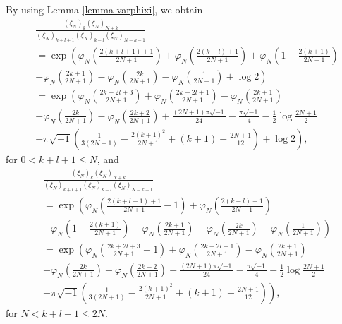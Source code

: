 \documentclass[12pt]{amsart}
\begin{document}
By using Lemma \ref{lemma-varphixi},  we obtain 
\begin{align}
    &\frac{(\xi_N)_k(\xi_N)_{N+k}}{(\xi_N)_{k+l+1}(\xi_N)_{k-l}(\xi_N)_{N-k-1}}\\\nonumber
    &=\exp\left(\varphi_N\left(\frac{2(k+l+1)+1}{2N+1}\right)+\varphi_N\left(\frac{2(k-l)+1}{2N+1}\right)+\varphi_N\left(1-\frac{2(k+1)}{2N+1}\right)\right.\\\nonumber
    &\left.-\varphi_N\left(\frac{2k+1}{2N+1}\right)-\varphi_N\left(\frac{2k}{2N+1}\right)-\varphi_N\left(\frac{1}{2N+1}\right)+\log 2\right) \\\nonumber
    &=\exp\left(\varphi_N\left(\frac{2k+2l+3}{2N+1}\right)+\varphi_N\left(\frac{2k-2l+1}{2N+1}\right)-\varphi_N\left(\frac{2k+1}{2N+1}\right)\right.\\\nonumber
    &\left.-\varphi_N\left(\frac{2k}{2N+1}\right)-\varphi_N\left(\frac{2k+2}{2N+1}\right)+\frac{(2N+1)\pi\sqrt{-1}}{24 }-\frac{\pi \sqrt{-1}}{4}-\frac{1}{2}\log \frac{2N+1}{2}\right.\\\nonumber
    &\left.+\pi \sqrt{-1}\left(\frac{1}{3(2N+1)}-\frac{2(k+1)^2}{2N+1}+(k+1)-\frac{2N+1}{12}\right)+\log 2\right),
\end{align}
for $0<k+l+1\leq N$, and
\begin{align}
    &\frac{(\xi_N)_k(\xi_N)_{N+k}}{(\xi_N)_{k+l+1}(\xi_N)_{k-l}(\xi_N)_{N-k-1}}\\\nonumber
    &=\exp\left(\varphi_N\left(\frac{2(k+l+1)+1}{2N+1}-1\right)+\varphi_N\left(\frac{2(k-l)+1}{2N+1}\right)\right.\\\nonumber
    &\left.+\varphi_N\left(1-\frac{2(k+1)}{2N+1}\right)-\varphi_N\left(\frac{2k+1}{2N+1}\right)-\varphi_N\left(\frac{2k}{2N+1}\right)-\varphi_N\left(\frac{1}{2N+1}\right)\right)\\\nonumber
    &=\exp\left(\varphi_N\left(\frac{2k+2l+3}{2N+1}-1\right)+\varphi_N\left(\frac{2k-2l+1}{2N+1}\right)-\varphi_N\left(\frac{2k+1}{2N+1}\right)\right.\\\nonumber
    &\left.-\varphi_N\left(\frac{2k}{2N+1}\right)-\varphi_N\left(\frac{2k+2}{2N+1}\right)+\frac{(2N+1)\pi\sqrt{-1}}{24 }-\frac{\pi \sqrt{-1}}{4}-\frac{1}{2}\log \frac{2N+1}{2} \right.\\\nonumber
    &\left.+\pi \sqrt{-1}\left(\frac{1}{3(2N+1)}-\frac{2(k+1)^2}{2N+1}+(k+1)-\frac{2N+1}{12}\right)\right),
\end{align}
 for $N<k+l+1\leq 2N$. 
\end{document}
